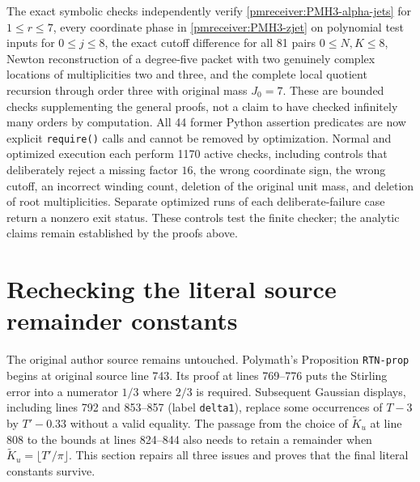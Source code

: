 The exact symbolic checks independently verify
\eqref{pmreceiver:PMH3-alpha-jets} for $1\le r\le7$, every coordinate phase
in \eqref{pmreceiver:PMH3-zjet} on polynomial test inputs for $0\le j\le8$,
the exact cutoff difference for all 81 pairs $0\le N,K\le8$,
Newton reconstruction of a degree-five packet with two genuinely
complex locations of multiplicities two and three, and the complete
local quotient recursion through order three with original mass
$J_0=7$. These are bounded checks supplementing the general proofs,
not a claim to have checked infinitely many orders by computation.
All 44 former Python assertion predicates are now explicit
\texttt{require()} calls and cannot be removed by optimization.
Normal and optimized execution each perform 1170 active checks,
including controls that deliberately reject a missing factor $16$,
the wrong coordinate sign, the wrong cutoff, an incorrect winding
count, deletion of the original unit mass, and deletion of root
multiplicities. Separate optimized runs of each deliberate-failure
case return a nonzero exit status. These controls test the finite
checker; the analytic claims remain established by the proofs above.

\section{Rechecking the literal source remainder constants}
\label{pmreceiver:sec:source-repair}

The original author source remains untouched. Polymath's Proposition
\texttt{RTN-prop} begins at original source line 743. Its proof at
lines 769--776 puts the Stirling error into a numerator $1/3$ where
$2/3$ is required. Subsequent Gaussian displays, including lines
792 and 853--857 (label \texttt{delta1}), replace some occurrences
of $T-3$ by $T'-0.33$ without a valid equality. The passage from
the choice of $\widetilde K_u$ at line 808 to the bounds at lines
824--844 also needs to retain a remainder when
$\widetilde K_u=\lfloor T'/\pi\rfloor$. This section repairs all
three issues and proves that the final literal constants survive.

